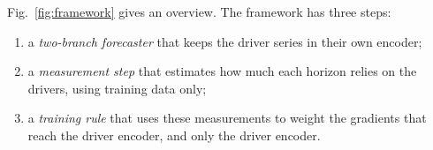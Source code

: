 \documentclass[conference]{IEEEtran}
\begin{document}
Fig.~\ref{fig:framework} gives an overview. The framework has three steps:
\begin{enumerate}
\item a \emph{two-branch forecaster} that keeps the driver series in their own encoder;
\item a \emph{measurement step} that estimates how much each horizon relies on the drivers, using training data only;
\item a \emph{training rule} that uses these measurements to weight the gradients that reach the driver encoder, and only the driver encoder.
\end{enumerate}

%
\end{document}
